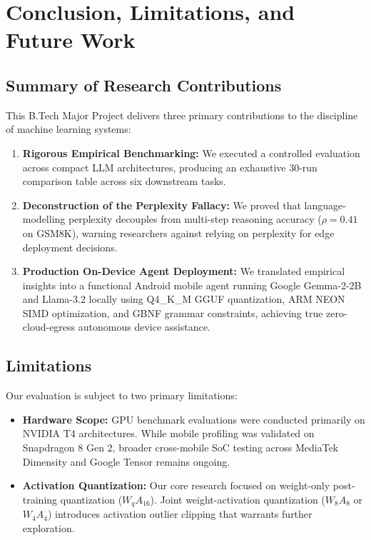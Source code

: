 \documentclass[12pt,a4paper,oneside]{report}
\begin{document}
\chapter{Conclusion, Limitations, and Future Work}

\section{Summary of Research Contributions}
This B.Tech Major Project delivers three primary contributions to the discipline of machine learning systems:
\begin{enumerate}
    \item \textbf{Rigorous Empirical Benchmarking:} We executed a controlled evaluation across compact LLM architectures, producing an exhaustive 30-run comparison table across six downstream tasks.
    \item \textbf{Deconstruction of the Perplexity Fallacy:} We proved that language-modelling perplexity decouples from multi-step reasoning accuracy ($\rho = 0.41$ on GSM8K), warning researchers against relying on perplexity for edge deployment decisions.
    \item \textbf{Production On-Device Agent Deployment:} We translated empirical insights into a functional Android mobile agent running Google Gemma-2-2B and Llama-3.2 locally using Q4\_K\_M GGUF quantization, ARM NEON SIMD optimization, and GBNF grammar constraints, achieving true zero-cloud-egress autonomous device assistance.
\end{enumerate}

\section{Limitations}
Our evaluation is subject to two primary limitations:
\begin{itemize}
    \item \textbf{Hardware Scope:} GPU benchmark evaluations were conducted primarily on NVIDIA T4 architectures. While mobile profiling was validated on Snapdragon 8 Gen 2, broader cross-mobile SoC testing across MediaTek Dimensity and Google Tensor remains ongoing.
    \item \textbf{Activation Quantization:} Our core research focused on weight-only post-training quantization ($W_q A_{16}$). Joint weight-activation quantization ($W_8 A_8$ or $W_4 A_4$) introduces activation outlier clipping that warrants further exploration.
\end{itemize}
\end{document}
